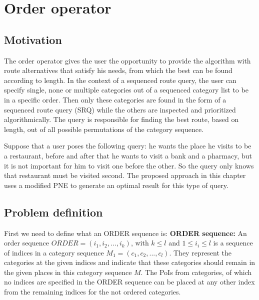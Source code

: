 

\section{Order operator}

\subsection{Motivation}
\label{sec:motORDER}
The order operator gives the user the opportunity to provide the algorithm with route alternatives that satisfy his needs, from which the best can be found according to length.  In the context of a sequenced route query, the user can specify single, none or multiple categories out of a sequenced category list to be in a specific order. Then only these categories are found in the form of a sequenced route query (SRQ) while the others are inspected and  prioritized algorithmically. The query is responsible for finding the best route, based on length, out of all possible permutations of the category sequence.

Suppose that a user poses the following query: he wants the place he visits to be a restaurant, before and after that he wants to visit a bank and a pharmacy, but it is not important for him to visit one before the other. So the query only knows that restaurant must be visited second. The proposed approach in this chapter uses a modified PNE to generate an optimal result for this type of query.

\subsection{Problem definition} 
\label{sec:problemOrder}
First we need to define what an ORDER sequence is:\newline
\textbf{ORDER sequence:} An order sequence $ORDER = (i_1, i_2, ..., i_k)$, with $k \leq l$ and $1 \leq i_i \leq l$ is a sequence of indices in a category sequence $M_1 = (c_1, c_2, ..., c_l)$. They represent the categories at the given indices and indicate that these categories should remain in the given places in this category sequence $M$. The PoIs from categories, of which no indices are specified in the ORDER sequence can be placed at any other index from the remaining indices for the not ordered categories.

